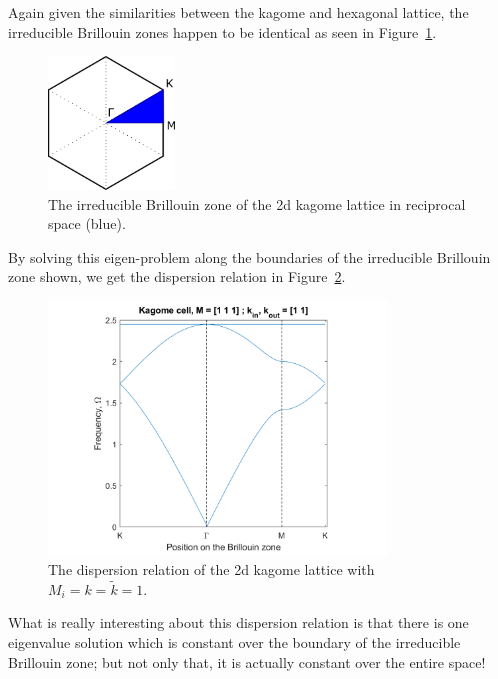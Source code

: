 
Again given the similarities between the kagome and hexagonal lattice, the
irreducible Brillouin zones happen to be identical as seen in
Figure~\ref{fig:ibzonekagome}.

\begin{figure}[!h]
\centering
\includegraphics[width=0.3\textwidth]{imgs/kagomeibz.png}
\caption{\label{fig:ibzonekagome} The irreducible Brillouin zone of the 2d
    kagome lattice in reciprocal space (blue).}
\end{figure}

By solving this eigen-problem along the boundaries of the irreducible Brillouin
zone shown, we get the dispersion relation in Figure~\ref{fig:kagomedisper}.

\begin{figure}[!h]
\centering
\includegraphics[width=0.8\textwidth]{imgs/kagomedisper.png}
\caption{\label{fig:kagomedisper} The dispersion relation of the 2d kagome
    lattice with $M_i=k=\tilde{k}=1$.}
\end{figure}

What is really interesting about this dispersion relation is that there is one
eigenvalue solution which is constant over the boundary of the irreducible
Brillouin zone; but not only that, it is actually constant over the entire
space!
